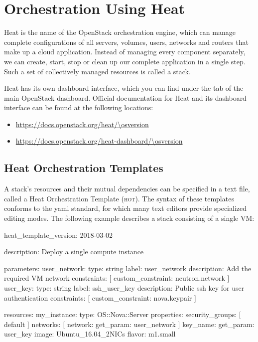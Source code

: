 \chapter{Orchestration Using Heat}\label{cha:orch-using-heat}
\gls{Heat} is the name of the OpenStack orchestration engine, which
can manage complete configurations of all servers, volumes, users,
networks and routers that make up a cloud application.  Instead of
managing every component separately, we can create, start, stop or
clean up our complete application in a single step.  Such a set of
collectively managed resources is called a \gls{stack}.

\gls{Heat} has its own dashboard interface, which you can find under
the  tab of the main OpenStack dashboard.  Official
documentation for Heat and its dashboard interface can be found at the
following locations:
\begin{itemize}
\item \url{https://docs.openstack.org/heat/\osversion}
\item \url{https://docs.openstack.org/heat-dashboard/\osversion}
\end{itemize}

\section{\gls{Heat Orchestration Template}s}\label{sec:glsh-orch-templ}
A \gls{stack}'s resources and their mutual dependencies can be
specified in a text file, called a \gls{Heat Orchestration Template}
(\textsc{hot}).  The syntax of these templates conforms to the
\gls{yaml} standard, for which many text editors provide specialized
editing modes.  The following example describes a stack consisting of
a single VM:
\begin{code}{}
heat_template_version: 2018-03-02

description: Deploy a single compute instance

parameters:
  user_network:
    type: string
    label: user_network
    description: Add the required VM network
    constraints: [ custom_constraint: neutron.network ]
  user_key:
    type: string
    label: ssh_user_key
    description: Public ssh key for user authentication
    constraints: [ custom_constraint: nova.keypair ]

resources:
  my_instance:
    type: OS::Nova::Server
    properties:
      security_groups: [ default ]
      networks: [ network: { get_param: user_network } ]
      key_name: { get_param: user_key }
      image: Ubuntu_16.04_2NICs
      flavor: m1.small
\end{code}

